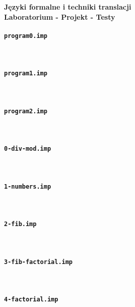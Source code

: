 \documentclass[12pt,a4paper]{article}
\begin{document}
\begin{center}
{\Large\bf Języki formalne i techniki translacji}\\
{\large\bf Laboratorium - Projekt - Testy}
\end{center}


\paragraph{\tt program0.imp} \



\paragraph{\tt program1.imp} \



\paragraph{\tt program2.imp} \



\paragraph{\tt 0-div-mod.imp} \



\paragraph{\tt 1-numbers.imp} \



\paragraph{\tt 2-fib.imp} \



\paragraph{\tt 3-fib-factorial.imp} \



\paragraph{\tt 4-factorial.imp} \
\end{document}
